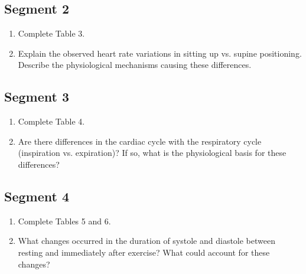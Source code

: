 \documentclass{article}
\begin{document}
\subsection*{Segment 2}
\begin{enumerate}
	\item Complete Table 3.
	\item Explain the observed heart rate variations in sitting up vs. supine positioning. Describe the physiological mechanisms causing these differences.
\end{enumerate}

\subsection*{Segment 3}
\begin{enumerate}
	\item Complete Table 4.
	\item Are there differences in the cardiac cycle with the respiratory cycle (inspiration vs. expiration)? If so, what is the physiological basis for these differences?
\end{enumerate}

\subsection*{Segment 4}
\begin{enumerate}
	\item Complete Tables 5 and 6.
	\item What changes occurred in the duration of systole and diastole between resting and immediately after exercise? What could account for these changes?
\end{enumerate}
\end{document}
